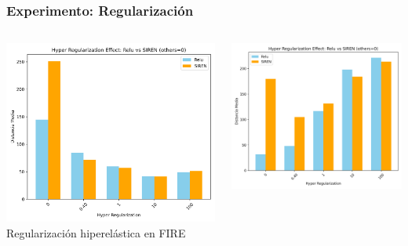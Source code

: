 \documentclass[xcolor=dvipsnames]{beamer}
\begin{document}
\begin{frame}
    \frametitle{Experimento: Regularización}
    
    
    \begin{columns}[T]
        \begin{column}{0.35\textwidth}
            \centering
            \includegraphics[width=\textwidth]{../imaxes/reg_examples/barplot_hyper_reg_comparison_MLP_vs_SIREN_FIRE.png}
            \small{Regularización hiperelástica en FIRE}
        \end{column}
        \begin{column}{0.35\textwidth}
            \centering
            \includegraphics[width=\textwidth]{../imaxes/reg_examples/barplot_hyper_reg_comparison_MLP_vs_SIREN_RFMID.png}

\end{column}
\end{columns}
\end{frame}
\end{document}
